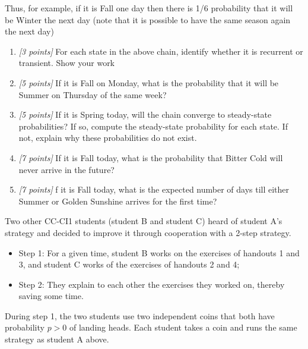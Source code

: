 \documentclass[article,12pt,a4paper]{article}
\newcounter{num}  %
\begin{document}
		Thus, for example, if it is Fall one day then there is 1/6 probability that it will be Winter the next
		day (note that it is possible to have the same season again the next day)
		\begin{enumerate}
			\item \textit{[3 points]} For each state in the above chain, identify whether it is recurrent or transient. Show
			your work
			
			\vspace{7cm}
			
			\item \textit{[5 points]} If it is Fall on Monday, what is the probability that it will be Summer on Thursday
			of the same week?
			
			
			\vspace{7cm}
			
			\item \textit{[5 points]}  If it is Spring today, will the chain converge to steady-state probabilities? If so,
			compute the steady-state probability for each state. If not, explain why these probabilities do
			not exist.
			
			
			\vspace{5cm}
			
				\item \textit{[7 points]}  If it is Fall today, what is the probability that Bitter Cold will never arrive in the
			future?
			
			\vspace{5cm}
			
			
			\item \textit{[7 points]} f it is Fall today, what is the expected number of days till either Summer or Golden
			Sunshine arrives for the first time? 
			
			\vspace{5cm}
			
			
		\end{enumerate}
		
		
		\newpage
		
		Two other CC-CI1 students (student B and student C) heard of student A's strategy and decided to improve it through cooperation with a 2-step strategy.
		\begin{itemize}
			\item Step 1: For a given time, student B works on the exercises of handouts 1 and 3, and student C works of the exercises of handouts 2 and 4;
			\item Step 2: They explain to each other the exercises they worked on, thereby saving some time. 
		\end{itemize}
		During step 1, the two students use two independent coins that both have probability $p>0$ of landing heads.
		Each student takes a coin and runs the same strategy as student A above.
		
\end{document}
